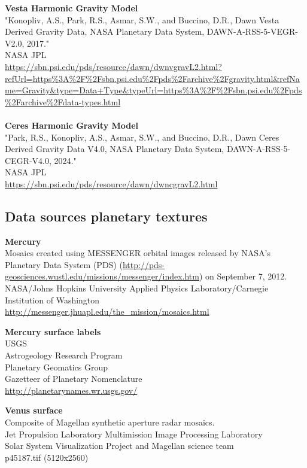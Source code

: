 \documentclass[Orbiter User Manual.tex]{subfiles}
\begin{document}
\textbf{Vesta Harmonic Gravity Model}\\
"Konopliv, A.S., Park, R.S., Asmar, S.W., and Buccino, D.R., Dawn Vesta Derived
Gravity Data, NASA Planetary Data System, DAWN-A-RSS-5-VEGR-V2.0, 2017."\\
NASA JPL\\
\url{https://sbn.psi.edu/pds/resource/dawn/dwnvgravL2.html?refUrl=https\%3A\%2F\%2Fsbn.psi.edu\%2Fpds\%2Farchive\%2Fgravity.html&refName=Gravity&type=Data+Type&typeUrl=https\%3A\%2F\%2Fsbn.psi.edu\%2Fpds\%2Farchive\%2Fdata-types.html}\\
\\
\textbf{Ceres Harmonic Gravity Model}\\
"Park, R.S., Konopliv, A.S., Asmar, S.W., and Buccino, D.R., Dawn Ceres Derived Gravity Data V4.0, NASA Planetary Data System, DAWN-A-RSS-5-CEGR-V4.0, 2024."\\
NASA JPL\\
\url{https://sbn.psi.edu/pds/resource/dawn/dwncgravL2.html}


\subsection{Data sources planetary textures}
\textbf{Mercury}\\
Mosaics created using MESSENGER orbital images released by NASA's Planetary Data
System (PDS) (\url{http://pds-geosciences.wustl.edu/missions/messenger/index.htm})
on September 7, 2012.\\
NASA/Johns Hopkins University Applied Physics Laboratory/Carnegie Institution of
Washington\\
\url{http://messenger.jhuapl.edu/the_mission/mosaics.html}

\textbf{Mercury surface labels}\\
USGS\\
Astrogeology Research Program\\
Planetary Geomatics Group\\
Gazetteer of Planetary Nomenclature\\
\url{http://planetarynames.wr.usgs.gov/}

\textbf{Venus surface}\\
Composite of Magellan synthetic aperture radar mosaics.\\
Jet Propulsion Laboratory Multimission Image Processing Laboratory\\
Solar System Visualization Project and Magellan science team\\
p45187.tif (5120x2560)
\end{document}
